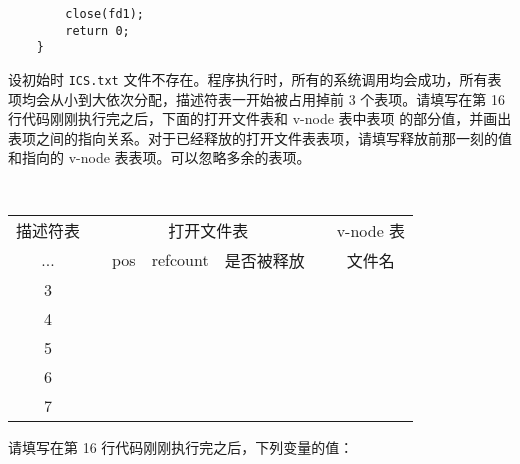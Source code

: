 \begin{problems}
\begin{verbatim}
        close(fd1);
        return 0;
    }
        \end{verbatim}
        \qn 设初始时 \verb|ICS.txt| 文件不存在。程序执行时，所有的系统调用均会成功，所有表项均会从小到大依次分配，描述符表一开始被占用掉前 3 个表项。请填写在第 16 行代码刚刚执行完之后，下面的打开文件表和 v-node 表中表项 的部分值，并画出表项之间的指向关系。对于已经释放的打开文件表表项，请填写释放前那一刻的值和指向的 v-node 表表项。可以忽略多余的表项。
        \begin{table}[H]
            \tt
            \centering
            \begin{tabular}{ccccccc}
                描述符表 & {\qquad} & \multicolumn{3}{c}{打开文件表} & {\qquad} & v-node 表 \\ \cline{1-1} \cline{3-5} \cline{7-7} 
                \multicolumn{1}{|c|}{...} & \multicolumn{1}{c|}{} & \multicolumn{1}{c|}{pos} & \multicolumn{1}{c|}{refcount} & \multicolumn{1}{c|}{是否被释放} & \multicolumn{1}{c|}{} & \multicolumn{1}{c|}{文件名} \\ \cline{1-1} \cline{3-5} \cline{7-7} 
                \multicolumn{1}{|c|}{3} & \multicolumn{1}{c|}{} & \multicolumn{1}{c|}{} & \multicolumn{1}{c|}{} & \multicolumn{1}{c|}{} & \multicolumn{1}{c|}{} & \multicolumn{1}{c|}{} \\ \cline{1-1} \cline{3-5} \cline{7-7} 
                \multicolumn{1}{|c|}{4} & \multicolumn{1}{c|}{} & \multicolumn{1}{c|}{} & \multicolumn{1}{c|}{} & \multicolumn{1}{c|}{} & \multicolumn{1}{c|}{} & \multicolumn{1}{c|}{} \\ \cline{1-1} \cline{3-5} \cline{7-7} 
                \multicolumn{1}{|c|}{5} & \multicolumn{1}{c|}{} & \multicolumn{1}{c|}{} & \multicolumn{1}{c|}{} & \multicolumn{1}{c|}{} & \multicolumn{1}{c|}{} & \multicolumn{1}{c|}{} \\ \cline{1-1} \cline{3-5} \cline{7-7} 
                \multicolumn{1}{|c|}{6} & \multicolumn{1}{c|}{} & \multicolumn{1}{c|}{} & \multicolumn{1}{c|}{} & \multicolumn{1}{c|}{} & \multicolumn{1}{c|}{} & \multicolumn{1}{c|}{} \\ \cline{1-1} \cline{3-5} \cline{7-7} 
                \multicolumn{1}{|c|}{7} & \multicolumn{1}{c|}{} & \multicolumn{1}{c|}{} & \multicolumn{1}{c|}{} & \multicolumn{1}{c|}{} & \multicolumn{1}{c|}{} & \multicolumn{1}{c|}{} \\ \cline{1-1} \cline{3-5} \cline{7-7} 
            \end{tabular}
        \end{table}
        \qn 请填写在第 16 行代码刚刚执行完之后，下列变量的值：

\end{problems}
